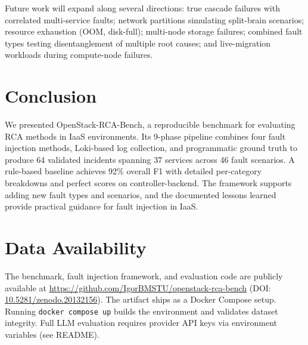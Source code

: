 \documentclass[sigconf,review]{acmart}
\begin{document}
Future work will expand along several directions: true cascade failures with correlated multi-service faults; network partitions simulating split-brain scenarios; resource exhaustion (OOM, disk-full); multi-node storage failures; combined fault types testing disentanglement of multiple root causes; and live-migration workloads during compute-node failures.

\section{Conclusion}
\label{sec:conclusion}
We presented OpenStack-RCA-Bench, a reproducible benchmark for evaluating RCA methods in IaaS environments. Its 9-phase pipeline combines four fault injection methods, Loki-based log collection, and programmatic ground truth to produce 64 validated incidents spanning 37 services across 46 fault scenarios. A rule-based baseline achieves 92\% overall F1 with detailed per-category breakdowns and perfect scores on controller-backend. The framework supports adding new fault types and scenarios, and the documented lessons learned provide practical guidance for fault injection in IaaS.

\section{Data Availability}
\label{sec:data}

The benchmark, fault injection framework, and evaluation code are publicly available at \url{https://github.com/IgorBMSTU/openstack-rca-bench} (DOI: \href{https://doi.org/10.5281/zenodo.20132156}{10.5281/zenodo.20132156}). The artifact ships as a Docker Compose setup. Running \texttt{docker compose up} builds the environment and validates dataset integrity. Full LLM evaluation requires provider API keys via environment variables (see README).
\end{document}
